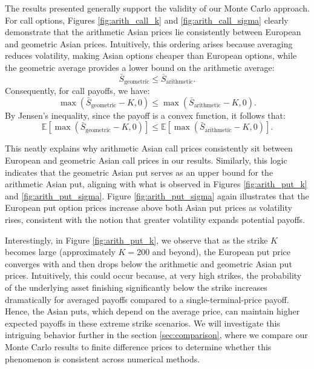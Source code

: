 The results presented generally support the validity of our Monte Carlo approach. For call options, 
Figures \ref{fig:arith_call_k} and \ref{fig:arith_call_sigma} clearly demonstrate that the 
arithmetic Asian prices lie consistently between European and geometric Asian prices. Intuitively, 
this ordering arises because averaging reduces volatility, making Asian options cheaper than European 
options, while the geometric average provides a lower bound on the arithmetic average:
\begin{equation*}
\bar{S}_{\text{geometric}} \leq \bar{S}_{\text{arithmetic}}.
\end{equation*}
Consequently, for call payoffs, we have:
\begin{equation*}
\max(\bar{S}_{\text{geometric}} - K, 0) \leq \max(\bar{S}_{\text{arithmetic}} - K, 0).
\end{equation*}
By Jensen's inequality, since the payoff is a convex function, it follows that:
\begin{equation*}
\mathbb{E}[\max(\bar{S}_{\text{geometric}} - K, 0)] \leq \mathbb{E}[\max(\bar{S}_{\text{arithmetic}} - K, 0)].
\end{equation*}

This neatly explains why arithmetic Asian call prices consistently sit between European and 
geometric Asian call prices in our results. Similarly, this logic indicates that the geometric Asian 
put serves as an upper bound for the arithmetic Asian put, aligning with what is observed in Figures 
\ref{fig:arith_put_k} and \ref{fig:arith_put_sigma}. Figure \ref{fig:arith_put_sigma} again illustrates
that the European put option prices increase above both Asian put prices as volatility rises, consistent
with the notion that greater volatility expands potential payoffs.

Interestingly, in Figure \ref{fig:arith_put_k}, we observe that as the strike $K$ becomes large 
(approximately $K=200$ and beyond), the European put price converges with and then drops below the 
arithmetic and geometric Asian put prices. Intuitively, this could occur because, at very high strikes,
the probability of the underlying asset finishing significantly below the strike increases dramatically
for averaged payoffs compared to a single-terminal-price payoff. Hence, the Asian puts, which depend 
on the average price, can maintain higher expected payoffs in these extreme strike scenarios. We 
will investigate this intriguing behavior further in the section \ref{sec:comparison}, where we 
compare our Monte Carlo results to finite difference prices to determine whether this phenomenon is 
consistent across numerical methods.

